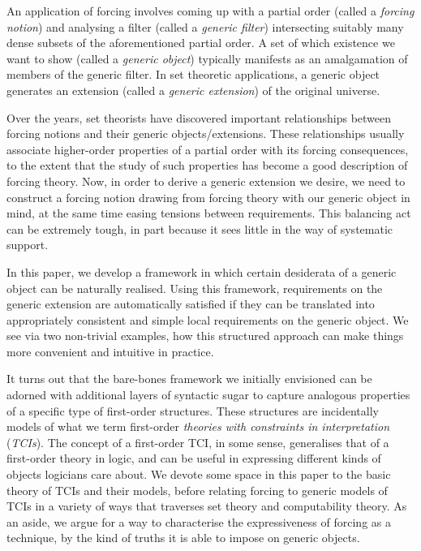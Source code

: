 \documentclass[12pt, twoside]{memoir}
\numberwithin{equation}{section}
\theoremstyle{definition}
\theoremstyle{remark}
\theoremstyle{definition}
\theoremstyle{definition}
\theoremstyle{definition}
\theoremstyle{remark}
\begin{document}
An application of forcing involves coming up with a partial order (called a \emph{forcing notion}) and analysing a filter (called a \emph{generic filter}) intersecting suitably many dense subsets of the aforementioned partial order. A set of which existence we want to show (called a \emph{generic object}) typically manifests as an amalgamation of members of the generic filter. In set theoretic applications, a generic object generates an extension (called a \emph{generic extension}) of the original universe. 

Over the years, set theorists have discovered important relationships between forcing notions and their generic objects\slash extensions. These relationships usually associate higher-order properties of a partial order with its forcing consequences, to the extent that the study of such properties has become a good description of forcing theory. Now, in order to derive a generic extension we desire, we need to construct a forcing notion drawing from forcing theory with our generic object in mind, at the same time easing tensions between requirements. This balancing act can be extremely tough, in part because it sees little in the way of systematic support.

In this paper, we develop a framework in which certain desiderata of a generic object can be naturally realised. Using this framework, requirements on the generic extension are automatically satisfied if they can be translated into appropriately consistent and simple local requirements on the generic object. We see via two non-trivial examples, how this structured approach can make things more convenient and intuitive in practice.

It turns out that the bare-bones framework we initially envisioned can be adorned with additional layers of syntactic sugar to capture analogous properties of a specific type of first-order structures. These structures are incidentally models of what we term first-order \emph{theories with constraints in interpretation} (\emph{TCIs}). The concept of a first-order TCI, in some sense, generalises that of a first-order theory in logic, and can be useful in expressing different kinds of objects logicians care about. We devote some space in this paper to the basic theory of TCIs and their models, before relating forcing to generic models of TCIs in a variety of ways that traverses set theory and computability theory. As an aside, we argue for a way to characterise the expressiveness of forcing as a technique, by the kind of truths it is able to impose on generic objects.
\end{document}
